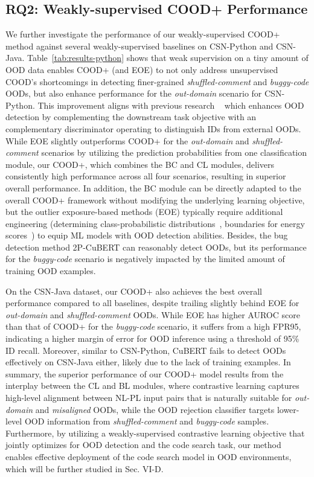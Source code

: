 \subsection{RQ2: Weakly-supervised COOD+ Performance}
We further investigate the performance of our weakly-supervised COOD+ method against several weakly-supervised baselines on CSN-Python and CSN-Java. Table~\ref{tab:results-python} shows that weak supervision on a tiny amount of OOD data enables COOD+ (and EOE) to not only address unsupervised COOD's shortcomings in detecting finer-grained \textit{shuffled-comment} and \textit{buggy-code} OODs, but also enhance performance for the \textit{out-domain} scenario for CSN-Python. This improvement aligns with previous research ~\cite{hendrycks2018deep, liu2020energy, kim-etal-2023-pseudo} which enhances OOD detection by complementing the downstream task objective with an complementary discriminator operating to distinguish IDs from external OODs. While EOE slightly outperforms COOD+ for the \textit{out-domain} and \textit{shuffled-comment} scenarios by utilizing the prediction probabilities from one classification module, our COOD+, which combines the BC and CL modules, delivers consistently high performance across all four scenarios, resulting in superior overall performance. In addition, the BC module can be directly adapted to the overall COOD+ framework without modifying the underlying learning objective, but the outlier exposure-based methods (\eg EOE) typically require additional engineering (\eg determining class-probabilistic distributions~\cite{hendrycks2018deep}, boundaries for energy scores~\cite{liu2020energy}) to equip ML models with OOD detection abilities. Besides, the bug detection method 2P-CuBERT can reasonably detect OODs, but its performance for the \textit{buggy-code} scenario is negatively impacted by the limited amount of training OOD examples.

On the CSN-Java dataset, our COOD+ also achieves the best overall performance compared to all baselines, despite trailing slightly behind EOE for \textit{out-domain} and \textit{shuffled-comment} OODs. While EOE has higher AUROC score than that of COOD+ for the \textit{buggy-code} scenario, it suffers from a high FPR95, indicating a higher margin of error for OOD inference using a threshold of 95\% ID recall. Moreover, similar to CSN-Python, CuBERT fails to detect OODs effectively on CSN-Java either, likely due to the lack of training examples. In summary, the superior performance of our COOD+ model results from the interplay between the CL and BL modules, where contrastive learning captures high-level alignment between NL-PL input pairs that is naturally suitable for \textit{out-domain} and \textit{misaligned} OODs, while the OOD rejection classifier targets lower-level OOD information from \textit{shuffled-comment} and \textit{buggy-code} samples. Furthermore, by utilizing a weakly-supervised contrastive learning objective that jointly optimizes for OOD detection and the code search task, our method enables effective deployment of the code search model in OOD environments, which will be further studied in Sec. VI-D.


